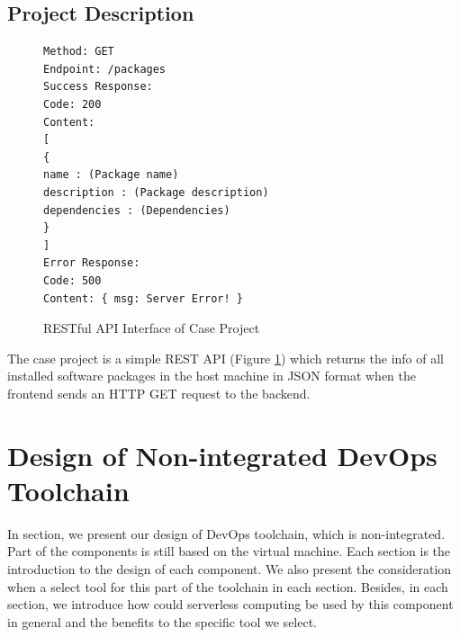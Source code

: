 \subsection{Project Description}
\begin{figure}[!h]
\begin{verbatim}
Method: GET
Endpoint: /packages
Success Response:
Code: 200
Content:
[
{
name : (Package name)
description : (Package description)
dependencies : (Dependencies)
}
]
Error Response:
Code: 500
Content: { msg: Server Error! }
\end{verbatim}
\label{fig:rest}
\caption{RESTful API Interface of Case Project}
\end{figure}
The case project is a simple REST API (Figure \ref{fig:rest}) which returns the info of all installed software packages in the host machine in JSON format when the frontend sends an HTTP GET request to the backend.
\section{Design of Non-integrated DevOps Toolchain}
In section, we present our design of DevOps toolchain, which is non-integrated. Part of the components is still based on the virtual machine. Each section is the introduction to the design of each component. We also present the consideration when a select tool for this part of the toolchain in each section. Besides, in each section, we introduce how could serverless computing be used by this component in general and the benefits to the specific tool we select.
